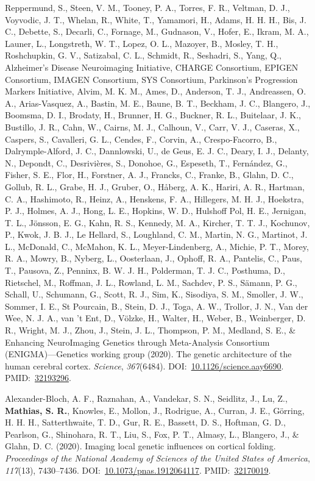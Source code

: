 \documentclass[10pt]{article}
\makeatletter
\newlength{\bibhang}
\newlength{\bibsep}
 {\@listi \global\bibsep\itemsep \global\advance\bibsep by\parsep}
\newenvironment{bibsection}%
        {\vspace{-\baselineskip}\begin{list}{}{%
       \setlength{\leftmargin}{\bibhang}%
       \setlength{\itemindent}{-\leftmargin}%
       \setlength{\itemsep}{\bibsep}%
       \setlength{\parsep}{\z@}%
        \setlength{\partopsep}{0pt}%
        \setlength{\topsep}{0pt}}}
        {\end{list}\vspace{-.6\baselineskip}}
\makeatother
\begin{document}
\begin{bibsection}
Reppermund, S., Steen, V. M., Tooney, P. A., Torres, F. R., Veltman, D. J., Voyvodic, J. T., Whelan, R., White, T., Yamamori, H., Adams, H. H. H., Bis, J. C., Debette, S., Decarli, C., Fornage, M., Gudnason, V., Hofer, E., Ikram, M. A., Launer, L., Longstreth, W. T., Lopez, O. L., Mazoyer, B., Mosley, T. H., Roshchupkin, G. V., Satizabal, C. L., Schmidt, R., Seshadri, S., Yang, Q., Alzheimer’s Disease Neuroimaging Initiative, CHARGE Consortium, EPIGEN Consortium, IMAGEN Consortium, SYS Consortium, Parkinson’s Progression Markers Initiative, Alvim, M. K. M., Ames, D., Anderson, T. J., Andreassen, O. A., Arias-Vasquez, A., Bastin, M. E., Baune, B. T., Beckham, J. C., Blangero, J., Boomsma, D. I., Brodaty, H., Brunner, H. G., Buckner, R. L., Buitelaar, J. K., Bustillo, J. R., Cahn, W., Cairns, M. J., Calhoun, V., Carr, V. J., Caseras, X., Caspers, S., Cavalleri, G. L., Cendes, F., Corvin, A., Crespo-Facorro, B., Dalrymple-Alford, J. C., Dannlowski, U., de Geus, E. J. C., Deary, I. J., Delanty, N., Depondt, C., Desrivières, S., Donohoe, G., Espeseth, T., Fernández, G., Fisher, S. E., Flor, H., Forstner, A. J., Francks, C., Franke, B., Glahn, D. C., Gollub, R. L., Grabe, H. J., Gruber, O., Håberg, A. K., Hariri, A. R., Hartman, C. A., Hashimoto, R., Heinz, A., Henskens, F. A., Hillegers, M. H. J., Hoekstra, P. J., Holmes, A. J., Hong, L. E., Hopkins, W. D., Hulshoff Pol, H. E., Jernigan, T. L., Jönsson, E. G., Kahn, R. S., Kennedy, M. A., Kircher, T. T. J., Kochunov, P., Kwok, J. B. J., Le Hellard, S., Loughland, C. M., Martin, N. G., Martinot, J. L., McDonald, C., McMahon, K. L., Meyer-Lindenberg, A., Michie, P. T., Morey, R. A., Mowry, B., Nyberg, L., Oosterlaan, J., Ophoff, R. A., Pantelis, C., Paus, T., Pausova, Z., Penninx, B. W. J. H., Polderman, T. J. C., Posthuma, D., Rietschel, M., Roffman, J. L., Rowland, L. M., Sachdev, P. S., Sämann, P. G., Schall, U., Schumann, G., Scott, R. J., Sim, K., Sisodiya, S. M., Smoller, J. W., Sommer, I. E., St Pourcain, B., Stein, D. J., Toga, A. W., Trollor, J. N., Van der Wee, N. J. A., van 't Ent, D., Völzke, H., Walter, H., Weber, B., Weinberger, D. R., Wright, M. J., Zhou, J., Stein, J. L., Thompson, P. M., Medland, S. E., \& Enhancing NeuroImaging Genetics through Meta-Analysis Consortium (ENIGMA)—Genetics working group (2020). The genetic architecture of the human cerebral cortex. \emph{Science}, \emph{367}(6484). DOI:~\href{https://doi.org/10.1126/science.aay6690}{10.1126/science.aay6690}. PMID:~\href{https://www.ncbi.nlm.nih.gov/pubmed/?term=32193296}{32193296}.

\item Alexander-Bloch, A. F., Raznahan, A., Vandekar, S. N., Seidlitz, J., Lu, Z., \textbf{Mathias, S. R.}, Knowles, E., Mollon, J., Rodrigue, A., Curran, J. E., Görring, H. H. H., Satterthwaite, T. D., Gur, R. E., Bassett, D. S., Hoftman, G. D., Pearlson, G., Shinohara, R. T., Liu, S., Fox, P. T., Almasy, L., Blangero, J., \& Glahn, D. C. (2020). Imaging local genetic influences on cortical folding. \emph{Proceedings of the National Academy of Sciences of the United States of America}, \emph{117}(13), 7430--7436. DOI:~\href{https://doi.org/10.1073/pnas.1912064117}{10.1073/pnas.1912064117}. PMID:~\href{https://www.ncbi.nlm.nih.gov/pubmed/?term=32170019}{32170019}.


\end{bibsection}
\end{document}
